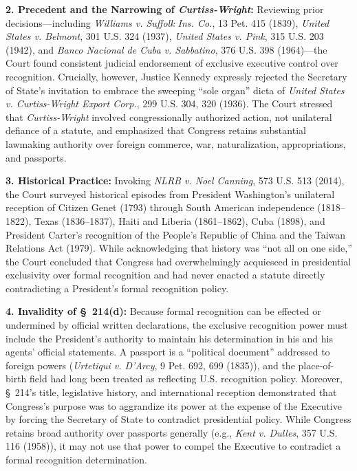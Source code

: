 \documentclass[12pt]{article}
\begin{document}
\textbf{2. Precedent and the Narrowing of \textit{Curtiss-Wright}:} Reviewing prior decisions---including \textit{Williams v. Suffolk Ins. Co.}, 13 Pet. 415 (1839), \textit{United States v. Belmont}, 301 U.S. 324 (1937), \textit{United States v. Pink}, 315 U.S. 203 (1942), and \textit{Banco Nacional de Cuba v. Sabbatino}, 376 U.S. 398 (1964)---the Court found consistent judicial endorsement of exclusive executive control over recognition. Crucially, however, Justice Kennedy expressly rejected the Secretary of State's invitation to embrace the sweeping ``sole organ'' dicta of \textit{United States v. Curtiss-Wright Export Corp.}, 299 U.S. 304, 320 (1936). The Court stressed that \textit{Curtiss-Wright} involved congressionally authorized action, not unilateral defiance of a statute, and emphasized that Congress retains substantial lawmaking authority over foreign commerce, war, naturalization, appropriations, and passports.

\textbf{3. Historical Practice:} Invoking \textit{NLRB v. Noel Canning}, 573 U.S. 513 (2014), the Court surveyed historical episodes from President Washington's unilateral reception of Citizen Genet (1793) through South American independence (1818--1822), Texas (1836--1837), Haiti and Liberia (1861--1862), Cuba (1898), and President Carter's recognition of the People's Republic of China and the Taiwan Relations Act (1979). While acknowledging that history was ``not all on one side,'' the Court concluded that Congress had overwhelmingly acquiesced in presidential exclusivity over formal recognition and had never enacted a statute directly contradicting a President's formal recognition policy.

\textbf{4. Invalidity of \S~214(d):} Because formal recognition can be effected or undermined by official written declarations, the exclusive recognition power must include the President's authority to maintain his determination in his and his agents' official statements. A passport is a ``political document'' addressed to foreign powers (\textit{Urtetiqui v. D'Arcy}, 9 Pet. 692, 699 (1835)), and the place-of-birth field had long been treated as reflecting U.S. recognition policy. Moreover, \S~214's title, legislative history, and international reception demonstrated that Congress's purpose was to aggrandize its power at the expense of the Executive by forcing the Secretary of State to contradict presidential policy. While Congress retains broad authority over passports generally (e.g., \textit{Kent v. Dulles}, 357 U.S. 116 (1958)), it may not use that power to compel the Executive to contradict a formal recognition determination.
\end{document}
